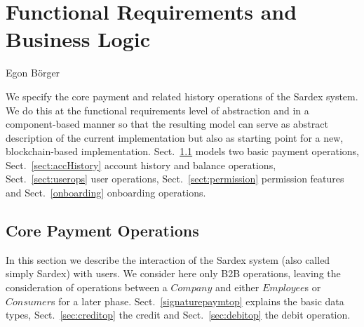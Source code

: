 \chapter{Functional Requirements and Business Logic}
\label{ch:funreq}


\vspace{-1cm}
\begin{center}
Egon B\"orger
\end{center}


We specify the core payment and related history operations of the Sardex system. We do this at the functional requirements  level of abstraction and in a component-based manner so that the resulting model can serve as abstract description of the current implementation but also as starting point for a new, blockchain-based implementation. Sect.~\ref{sect:paymtops} models  two basic payment operations, Sect.~\ref{sect:accHistory} account history and balance operations, Sect.~\ref{sect:userops} user operations, Sect.~\ref{sect:permission} permission features and Sect.~\ref{onboarding} onboarding operations.


\section{Core Payment Operations}
\label{sect:paymtops}

In this section we describe the interaction of the Sardex system (also called simply Sardex)  with users. We consider here only B2B operations, leaving the consideration of operations between a $Company$ and either $Employee$s or $Consumer$s for a later phase. Sect.~\ref{signaturepaymtop} explains the basic data types,  Sect.~\ref{sec:creditop} the credit and  Sect.~\ref{sec:debitop} the debit operation.

